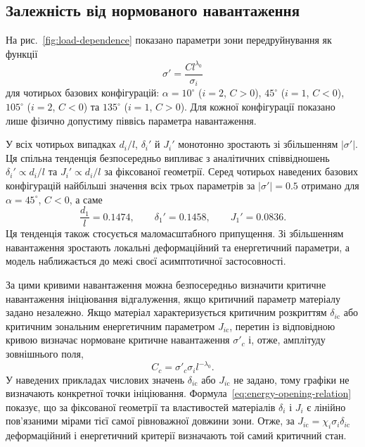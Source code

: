 \subsection{Залежність від нормованого навантаження}
\label{subsec:figure2}

На рис.~\ref{fig:load-dependence} показано параметри зони передруйнування як функції
\begin{equation*}
  \sigma'=\frac{Cl^{\lambda_0}}{\sigma_i}
\end{equation*}
для чотирьох базових конфігурацій: $\alpha=10^\circ$ ($i=2$, $C>0$), $45^\circ$ ($i=1$, $C<0$), $105^\circ$ ($i=2$, $C<0$) та $135^\circ$ ($i=1$, $C>0$). Для кожної конфігурації показано лише фізично допустиму піввісь параметра навантаження.


У всіх чотирьох випадках $d_i/l$, $\delta_i'$ й $J_i'$ монотонно зростають зі збільшенням $|\sigma'|$. Ця спільна тенденція безпосередньо випливає з аналітичних співвідношень $\delta_i'\propto d_i/l$ та $J_i'\propto d_i/l$ за фіксованої геометрії. Серед чотирьох наведених базових конфігурацій найбільші значення всіх трьох параметрів за $|\sigma'|=0.5$ отримано для $\alpha=45^\circ$, $C<0$, а саме
\begin{equation*}
  \frac{d_1}{l}=0.1474,\qquad
  \delta_1'=0.1458,\qquad
  J_1'=0.0836.
\end{equation*}
Ця тенденція також стосується маломасштабного припущення. Зі збільшенням навантаження зростають локальні деформаційний та енергетичний параметри, а модель наближається до межі своєї асимптотичної застосовності.

За цими кривими навантаження можна безпосередньо визначити критичне навантаження ініціювання відгалуження, якщо критичний параметр матеріалу задано незалежно. Якщо матеріал характеризується критичним розкриттям $\delta_{i\mathrm{c}}$ або критичним зональним енергетичним параметром $J_{i\mathrm{c}}$, перетин із відповідною кривою визначає нормоване критичне навантаження $\sigma'_c$ і, отже, амплітуду зовнішнього поля,
\begin{equation*}
  C_c=\sigma'_c\sigma_i l^{-\lambda_0}.
\end{equation*}
У наведених прикладах числових значень $\delta_{i\mathrm{c}}$ або $J_{i\mathrm{c}}$ не задано, тому графіки не визначають конкретної точки ініціювання. Формула~\eqref{eq:energy-opening-relation} показує, що за фіксованої геометрії та властивостей матеріалів $\delta_i$ і $J_i$ є лінійно пов’язаними мірами тієї самої рівноважної довжини зони. Отже, за $J_{i\mathrm{c}}=\chi_i\sigma_i\delta_{i\mathrm{c}}$ деформаційний і енергетичний критерії визначають той самий критичний стан.

